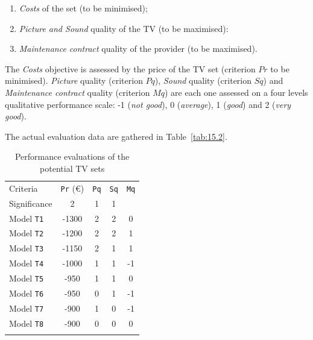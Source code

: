 \begin{enumerate}[topsep=3pt]
\item \emph{Costs} of the set (to be minimised); 
\item \emph{Picture and Sound} quality of the TV (to be maximised):
\item \emph{Maintenance contract} quality of the provider (to be maximised).
\end{enumerate}

The \emph{Costs} objective is assessed by the price of the TV set (criterion $Pr$ to be minimised). \emph{Picture} quality (criterion $Pq$), \emph{Sound} quality (criterion $Sq$) and \emph{Maintenance contract} quality (criterion $Mq$) are each one assessed on a four levels qualitative performance scale: -1 (\emph{not good}), 0 (\emph{average}), 1 (\emph{good}) and 2 (\emph{very good}).

The actual evaluation data are gathered in Table~\vref{tab:15.2}.
\begin{table}[ht]
\caption{Performance evaluations of the potential TV sets}
\label{tab:15.2}       %
\begin{center}
    \begin{tabular}{l|c|c|c|c}
      \svhline\noalign{\smallskip}
      Criteria & \texttt{Pr} (€) & \texttt{Pq} & \texttt{Sq} & \texttt{Mq} \\
      Significance & 2  & 1  & 1  & \\
      \noalign{\smallskip}\hline\noalign{\smallskip}
      Model \texttt{T1}   &     -1300  &  2  &  2  &   0\\
      Model \texttt{T2}   &     -1200  &  2  &  2  &   1\\
      Model \texttt{T3}   &     -1150  &  2  &  1  &   1\\
      Model \texttt{T4}   &     -1000  &  1  &  1  &  -1\\
      Model \texttt{T5}   &     -950   &  1  &  1  &   0\\
      Model \texttt{T6}   &     -950   &  0  &  1  &  -1\\
      Model \texttt{T7}   &     -900   &  1  &  0  &  -1\\
      Model \texttt{T8}   &     -900   &  0  &  0  &   0\\
      \noalign{\smallskip}\hline
    \end{tabular}
\end{center}
\end{table}

